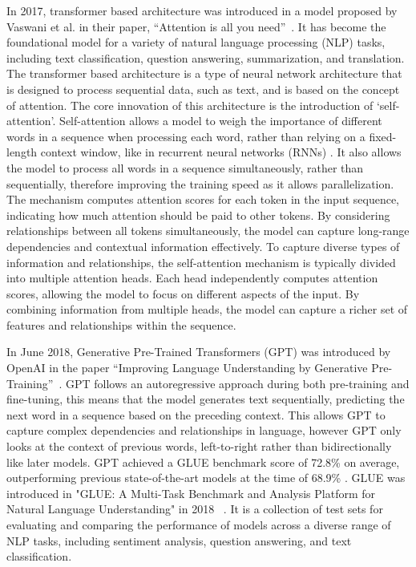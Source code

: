 \documentclass{UoYCSproject}
\begin{document}
    In 2017, transformer based architecture was introduced in a model proposed by Vaswani et al.
    in their paper, ``Attention is all you need''~\cite{vaswani2023attention}.
    It has become the foundational model for a variety of natural language processing (NLP) tasks, including text classification, question answering, summarization, and translation.
    The transformer based architecture is a type of neural network architecture that is designed to process sequential data, such as text, and is based on the concept of attention.
    The core innovation of this architecture is the introduction of `self-attention'.
    Self-attention allows a model to weigh the importance of different words in a sequence when processing each word, rather than relying on a fixed-length context window, like in recurrent neural networks (RNNs) \cite{RNNbook}.
    It also allows the model to process all words in a sequence simultaneously, rather than sequentially, therefore improving the training speed as it allows parallelization.
    The mechanism computes attention scores for each token in the input sequence, indicating how much attention should be paid to other tokens.
    By considering relationships between all tokens simultaneously, the model can capture long-range dependencies and contextual information effectively.
    To capture diverse types of information and relationships, the self-attention mechanism is typically divided into multiple attention heads.
    Each head independently computes attention scores, allowing the model to focus on different aspects of the input.
    By combining information from multiple heads, the model can capture a richer set of features and relationships within the sequence.
    \par
    In June 2018, Generative Pre-Trained Transformers (GPT) was introduced by OpenAI in the paper ``Improving Language Understanding by Generative Pre-Training''~\cite{GPT2018}.
    GPT follows an autoregressive approach during both pre-training and fine-tuning, this means that the model generates text sequentially, predicting the next word in a sequence based on the preceding context.
    This allows GPT to capture complex dependencies and relationships in language, however GPT only looks at the context of previous words, left-to-right rather than bidirectionally like later models.
    GPT achieved a GLUE benchmark score of 72.8\% on average, outperforming previous state-of-the-art models at the time of 68.9\% .
    GLUE was introduced in "GLUE: A Multi-Task Benchmark and Analysis Platform for Natural Language Understanding" in 2018 ~\cite{wang2019glue}.
    It is a collection of test sets for evaluating and comparing the performance of models across a diverse range of NLP tasks, including sentiment analysis, question answering, and text classification.
\end{document}
